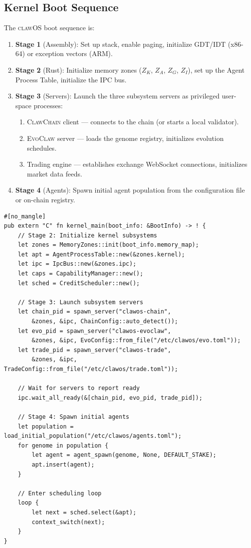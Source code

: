 \documentclass{article}
\newcommand{\clawos}{\textsc{clawOS}}
\newcommand{\evoclaw}{\textsc{EvoClaw}}
\newcommand{\clawchain}{\textsc{ClawChain}}
\begin{document}
\subsection{Kernel Boot Sequence}

The \clawos{} boot sequence is:

\begin{enumerate}[leftmargin=*]
    \item \textbf{Stage 1} (Assembly): Set up stack, enable paging, initialize GDT/IDT (x86-64) or exception vectors (ARM).
    \item \textbf{Stage 2} (Rust): Initialize memory zones ($Z_K$, $Z_A$, $Z_G$, $Z_I$), set up the Agent Process Table, initialize the IPC bus.
    \item \textbf{Stage 3} (Servers): Launch the three subsystem servers as privileged user-space processes:
    \begin{enumerate}
        \item \clawchain{} client — connects to the chain (or starts a local validator).
        \item \evoclaw{} server — loads the genome registry, initializes evolution schedules.
        \item Trading engine — establishes exchange WebSocket connections, initializes market data feeds.
    \end{enumerate}
    \item \textbf{Stage 4} (Agents): Spawn initial agent population from the configuration file or on-chain registry.
\end{enumerate}

\begin{lstlisting}[style=rustcode, caption={Kernel boot sequence (simplified).}, label={lst:boot}]
#[no_mangle]
pub extern "C" fn kernel_main(boot_info: &BootInfo) -> ! {
    // Stage 2: Initialize kernel subsystems
    let zones = MemoryZones::init(boot_info.memory_map);
    let apt = AgentProcessTable::new(&zones.kernel);
    let ipc = IpcBus::new(&zones.ipc);
    let caps = CapabilityManager::new();
    let sched = CreditScheduler::new();

    // Stage 3: Launch subsystem servers
    let chain_pid = spawn_server("clawos-chain",
        &zones, &ipc, ChainConfig::auto_detect());
    let evo_pid = spawn_server("clawos-evoclaw",
        &zones, &ipc, EvoConfig::from_file("/etc/clawos/evo.toml"));
    let trade_pid = spawn_server("clawos-trade",
        &zones, &ipc, TradeConfig::from_file("/etc/clawos/trade.toml"));

    // Wait for servers to report ready
    ipc.wait_all_ready(&[chain_pid, evo_pid, trade_pid]);

    // Stage 4: Spawn initial agents
    let population = load_initial_population("/etc/clawos/agents.toml");
    for genome in population {
        let agent = agent_spawn(genome, None, DEFAULT_STAKE);
        apt.insert(agent);
    }

    // Enter scheduling loop
    loop {
        let next = sched.select(&apt);
        context_switch(next);
    }
}
\end{lstlisting}
\end{document}
